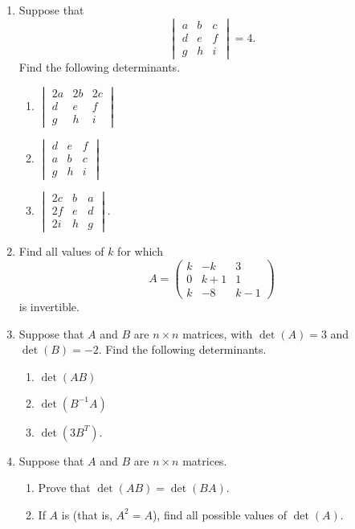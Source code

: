 \documentclass[english,12pt,a4paper]{scrartcl}
\begin{document}
\begin{enumerate}
  \item %
    Suppose that
    \[
      \begin{vmatrix}
        a & b & c \\
        d & e & f \\
        g & h & i
      \end{vmatrix}
       = 4.
    \]
    Find the following determinants.
    \begin{multicols}{3}
      \begin{enumerate}
        \item $
          \begin{vmatrix}
            2a & 2b & 2c \\
            d & e & f \\
            g & h & i
          \end{vmatrix}
          $
        \item $
          \begin{vmatrix}
            d & e & f \\
            a & b & c \\
            g & h & i
          \end{vmatrix}
          $
        \item $
          \begin{vmatrix}
            2c & b & a \\
            2f & e & d \\
            2i & h & g
          \end{vmatrix}
          $.
      \end{enumerate}
    \end{multicols}
  \item %
    Find all values of $k$ for which
    \[
      A =
      \begin{pmatrix}
        k & -k & 3 \\
        0 & k + 1 & 1 \\
        k & -8 & k - 1
      \end{pmatrix}
    \]
    is invertible.
  \item %
    Suppose that $A$ and $B$ are $n \times n$ matrices, with $\det(A) = 3$ and 
    $\det(B) = -2$. Find the following determinants.
    \begin{multicols}{3}
      \begin{enumerate}
        \item $\det(AB)$
        \item $\det(B^{-1}A)$
        \item $\det(3B^T)$.
      \end{enumerate}
    \end{multicols}
  \item %
    Suppose that $A$ and $B$ are $n \times n$ matrices.
    \begin{enumerate}
      \item Prove that $\det(AB) = \det(BA)$.
      \item If $A$ is  (that is, $A^2 = A$), find all possible 
        values of $\det(A)$.
    \end{enumerate}
\end{enumerate}
\end{document}
